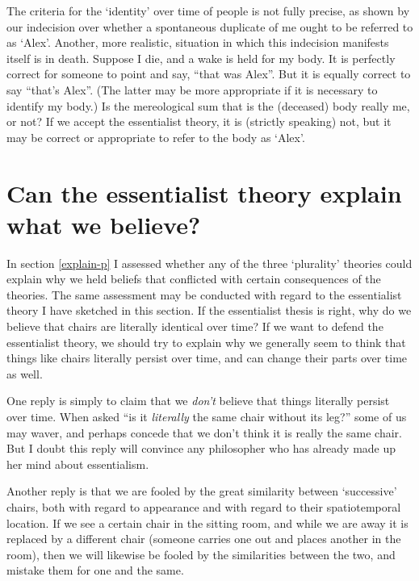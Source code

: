 \documentclass[11pt]{article}
\begin{document}
\begin{spacing}{1.5}
The criteria for the `identity' over time of people is not fully
precise, as shown by our indecision over whether a spontaneous
duplicate of me ought to be referred to as `Alex'.  Another, more
realistic, situation in which this indecision manifests itself is in
death.  Suppose I die, and a wake is held for my body.  It is
perfectly correct for someone to point and say, ``that was Alex''.
But it is equally correct to say ``that's Alex''.  (The latter may be
more appropriate if it is necessary to identify my body.)  Is the
mereological sum that is the (deceased) body really me, or not?  If we
accept the essentialist theory, it is (strictly speaking) not, but it
may be correct or appropriate to refer to the body as `Alex'.

\section{Can the essentialist theory explain what we believe?}
\label{explain-e}
In section \ref{explain-p} I assessed whether any of the three
`plurality' theories could explain why we held beliefs that conflicted
with certain consequences of the theories.  The same assessment may
be conducted with regard to the essentialist theory I have sketched in
this section.  If the essentialist thesis is right, why do we believe
that chairs are literally identical over time?  If we want to defend
the essentialist theory, we should try to explain why we generally
seem to think that things like chairs literally persist over time, and
can change their parts over time as well.

One reply is simply to claim that we {\em don't} believe that things
literally persist over time.  When asked ``is it {\em literally} the
same chair without its leg?'' some of us may waver, and perhaps
concede that we don't think it is really the same chair.  But I doubt
this reply will convince any philosopher who has already made up her
mind about essentialism.

Another reply is that we are fooled by the great similarity between
`successive' chairs, both with regard to appearance and with regard to
their spatiotemporal location.  If we see a certain chair in the
sitting room, and while we are away it is replaced by a different
chair (someone carries one out and places another in the room), then
we will likewise be fooled by the similarities between the two, and
mistake them for one and the same.



\end{spacing}
\end{document}
